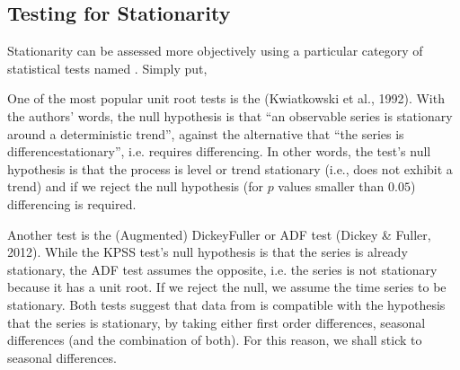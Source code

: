 \documentclass[letterpaper,10pt,english]{jupyterBook}
\begin{document}
\subsection{Testing for Stationarity}
\label{\detokenize{05-time_series_analysis:testing-for-stationarity}}
\sphinxAtStartPar
Stationarity can be assessed more objectively using a particular category of statistical tests named . Simply put,

\sphinxAtStartPar
One of the most popular unit root tests is the  (Kwiatkowski et al., 1992). With the authors’ words, the null hypothesis is that “an observable series is stationary around a deterministic trend”, against the alternative that “the series is difference\sphinxhyphen{}stationary”, i.e. requires differencing. In other words, the test’s null hypothesis is that the process is level or trend stationary (i.e., does not exhibit a trend) and if we reject the null hypothesis (for \(p\) values smaller than \(0.05\)) differencing is required.

\sphinxAtStartPar
Another test is the (Augmented) Dickey\sphinxhyphen{}Fuller or ADF test (Dickey \& Fuller, 2012). While the KPSS test’s null hypothesis is that the series is already stationary, the ADF test assumes the opposite, i.e. the series is not stationary because it has a unit root. If we reject the null, we assume the time series to be stationary. Both tests suggest that data from  is compatible with the hypothesis that the series is stationary, by taking either first order differences, seasonal differences (and the combination of both). For this reason, we shall stick to seasonal differences.
\end{document}
